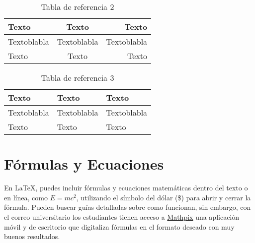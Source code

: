 \begin{minipage}[H]{0.49\textwidth}
    \begin{table}[H]
        \centering
        \begin{measuredfigure}
            \caption{Tabla de referencia 2}
            \begin{tabular}{| l | c | r |}
            \hline
                \textbf{Texto} & \textbf{Texto} & \textbf{Texto} \\ \hline
                Textoblabla    & Textoblabla   & Textoblabla \\ \hline
                Texto    & Texto   & Texto \\ \hline
            \end{tabular}
        \end{measuredfigure}
    \end{table}
\end{minipage}
\begin{minipage}[H]{0.49\textwidth}
    \begin{table}[H]
        \centering
        \begin{measuredfigure}
            \caption{Tabla de referencia 3}
            \begin{tabular}{l l l}
            \toprule
                \textbf{Texto} & \textbf{Texto} & \textbf{Texto} \\
                \midrule
                Textoblabla    & Textoblabla   & Textoblabla \\
                Texto    & Texto   & Texto \\
                \bottomrule
            \end{tabular}
        \end{measuredfigure}
    \end{table}
\end{minipage}

\section{Fórmulas y Ecuaciones}

En LaTeX, puedes incluir fórmulas y ecuaciones matemáticas dentro del texto o en línea, como $E = mc^2$, utilizando el símbolo del dólar (\$) para abrir y cerrar la fórmula. Pueden buscar guías detalladas sobre como funcionan, sin embargo, con el correo universitario los estudiantes tienen acceso a \href{https://mathpix.com}{Mathpix} una aplicación móvil y de escritorio que digitaliza fórmulas en el formato deseado con muy buenos resultados.

